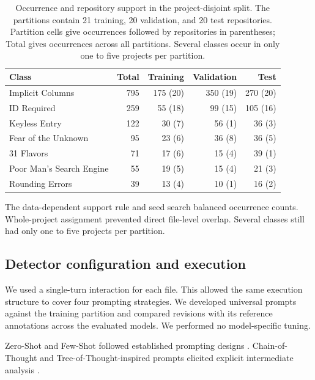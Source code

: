 \begin{table}[tbp]
    \centering
    \small
    \caption{Occurrence and repository support in the project-disjoint split. The partitions contain \num{21} training, \num{20} validation, and \num{20} test repositories. Partition cells give occurrences followed by repositories in parentheses; Total gives occurrences across all partitions. Several classes occur in only one to five projects per partition.}
    \label{tab:trainingTestValidationSplit}
    \begin{tabular}{lrrrr}
        \hline
        \textbf{Class} & \textbf{Total} & \textbf{Training} & \textbf{Validation} & \textbf{Test} \\
        \hline
        Implicit Columns & 795 & 175 (20) & 350 (19) & 270 (20) \\
        ID Required & 259 & 55 (18) & 99 (15) & 105 (16) \\
        Keyless Entry & 122 & 30 (7) & 56 (1) & 36 (3) \\
        Fear of the Unknown & 95 & 23 (6) & 36 (8) & 36 (5) \\
        31 Flavors & 71 & 17 (6) & 15 (4) & 39 (1) \\
        Poor Man's Search Engine & 55 & 19 (5) & 15 (4) & 21 (3) \\
        Rounding Errors & 39 & 13 (4) & 10 (1) & 16 (2) \\
        \hline
    \end{tabular}
\end{table}

The data-dependent support rule and seed search balanced occurrence counts. Whole-project assignment prevented direct file-level overlap. Several classes still had only one to five projects per partition.

\subsection{Detector configuration and execution}\label{sec:experimentsQuantitative}

We used a single-turn interaction for each file. This allowed the same execution structure to cover four prompting strategies. We developed universal prompts against the training partition and compared revisions with its reference annotations across the evaluated models. We performed no model-specific tuning.

Zero-Shot and Few-Shot followed established prompting designs . Chain-of-Thought and Tree-of-Thought-inspired prompts elicited explicit intermediate analysis .

